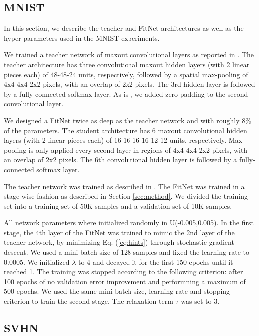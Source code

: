\documentclass{article} %
\begin{document}
\subsection{MNIST}

In this section, we describe the teacher and FitNet architectures as well as the hyper-parameters used in the MNIST experiments.

We trained a teacher network of maxout convolutional layers as reported in
\citet{Goodfellow13}. The teacher architecture has three convolutional maxout hidden
layers (with 2 linear pieces each) of 48-48-24 units, respectively, followed by a spatial max-pooling of
4x4-4x4-2x2 pixels, with an overlap of 2x2 pixels. The 3rd hidden layer is
followed by a fully-connected softmax layer. As is \citet{Goodfellow13}, we
added zero padding to the second convolutional layer. 

We designed a FitNet twice as deep as the teacher network and with roughly $8\%$ of the parameters. The student architecture has 6 maxout convolutional hidden layers (with 2 linear pieces each) of 16-16-16-16-12-12 units, respectively. Max-pooling is only applied every second layer in regions of 4x4-4x4-2x2 pixels, with an overlap of 2x2
pixels. The 6th convolutional hidden layer is followed by a fully-connected
softmax layer.

The teacher network was trained as described in \citet{Goodfellow13}. The FitNet was trained in a stage-wise fashion as described in Section \ref{sec:method}. We divided the training set into a training set of 50K samples and a validation set of 10K samples. 

All network parameters where initialized randomly in U(-0.005,0.005). In the first stage, the 4th layer of the FitNet was trained to mimic the 2nd layer of the teacher network, by minimizing Eq. (\ref{eq:hints}) through stochastic gradient descent. We used a mini-batch size of 128 samples and fixed the learning rate to 0.0005. We initialized $\lambda$ to 4 and decayed it for the first 150 epochs until it reached 1. The training was stopped according to the following criterion: after 100 epochs of no validation error improvement and performning a maximum of 500 epochs. We used the same mini-batch size, learning rate and stopping criterion to train the second stage. The relaxation term $\tau$ was set to 3.

\subsection{SVHN}
\label{sec:svhn}
\end{document}
